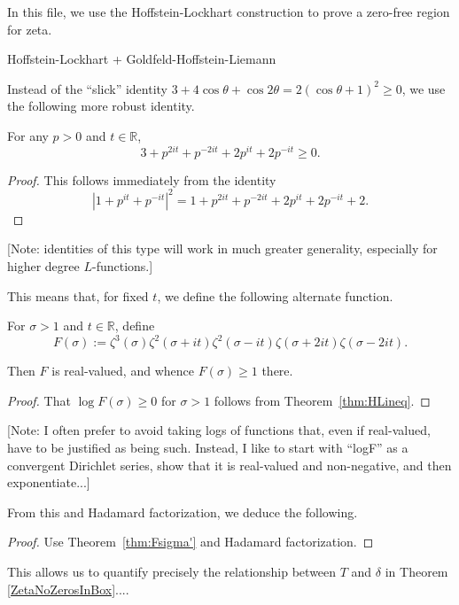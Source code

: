 

In this file, we use the Hoffstein-Lockhart construction to prove a zero-free region for zeta.

Hoffstein-Lockhart + Goldfeld-Hoffstein-Liemann

Instead of the ``slick'' identity $3+4\cos\theta+\cos2\theta=2(\cos\theta+1)^2\ge0$, we use the following  more robust identity.
\begin{theorem}\label{thm:HLineq}
For any $p>0$ and $t\in\mathbb{R}$,
$$
3+p^{2it}+p^{-2it}+2p^{it}+2p^{-it} \ge 0.
$$
\end{theorem}
\begin{proof}
This follows immediately from the identity
$$
|1+p^{it}+p^{-it}|^2=1+p^{2it}+p^{-2it}+2p^{it}+2p^{-it}+2.
$$
\end{proof}
[Note: identities of this type will work in much greater generality, especially for
higher degree $L$-functions.]

This means that, for fixed $t$, we define the following alternate function.
\begin{definition}\label{def:Fsigma'} For $\sigma>1$ and $t\in\mathbb{R}$, define
$$
F(\sigma) := \zeta^3(\sigma)\zeta^2(\sigma+it)\zeta^2(\sigma-it)\zeta(\sigma+2it)\zeta(\sigma-2it).
$$
\end{definition}
\begin{theorem}\label{thm:Fsigma'}
Then $F$ is real-valued, and
whence $F(\sigma)\ge1$ there.
\end{theorem}
\begin{proof}
That
$\log F(\sigma)\ge0$ for $\sigma>1$ follows from
Theorem~\ref{thm:HLineq}.
\end{proof}
[Note: I often prefer to avoid taking logs of functions that, even if real-valued, have to be justified as being such. Instead, I like to start with ``logF'' as a convergent
Dirichlet series, show that it is real-valued and non-negative, and then exponentiate...]

From this and Hadamard factorization, we deduce the following.
\begin{proof}
Use Theorem~\ref{thm:Fsigma'} and Hadamard factorization.
\end{proof}

This allows us to quantify precisely the relationship between $T$ and $\delta$ in
Theorem \ref{ZetaNoZerosInBox}....



